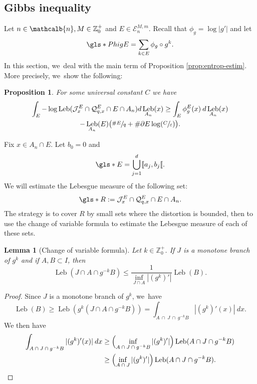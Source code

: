 \documentclass[10pt]{amsart}
\DeclareMathOperator{\Leb}{Leb}
\newcommand{\mcbn}{{\mathcalb{n}}}
\newtheorem{lem}[thm]{Lemma}
\newtheorem{prop}[thm]{Proposition}
\theoremstyle{definition}
\newcommand{\bbZ}{{\mathbb{Z}}}
\begin{document}
\subsection{Gibbs inequality}
\label{ssec:gibbs}

Let $n \in \mcbn, M \in \bbZ_0^+$ and $E \in \mathcal{E}_n^{M,m}$. Recall that $\phi_g = \log |g'|$ and let
\[
\gls*{PhigE} = \sum_{k \in E} \phi_g \circ g^k.
\]
In this section, we~deal with the main term of Proposition \ref{prop:entrop-estim}.
More precisely, we~show the following:

\begin{prop}
\label{prop:Gibbs}
For some universal constant $C$ we have
\begin{multline*}
\int_E - \log \Leb(\mathcal{J}^E_x \cap \mathcal{Q}_{q,x}^E \cap E \cap A_n) d \Leb_{A_n}(x)
\geq \int_E \phi_g^E(x) \: d \Leb_{A_n}(x)\\
- \Leb_{A_n}(E) \bigl (\sfrac{\# E }{q} + \# \partial E \log (\sfrac{C}{\varepsilon}) \bigr).
\end{multline*}
\end{prop}

Fix $x \in A_n \cap E$. Let $b_0 = 0$ and
\[
\gls*{E} = \bigcup_{j = 1}^d [\![ a_j, b_j [\![.
\]
We will estimate the Lebesgue measure of the following set:
\[
\gls*{R} := \mathcal{J}^E_x \cap \mathcal{Q}_{q,x}^{E} \cap E \cap A_n.
\]
The strategy is to cover $R$ by small sets where the distortion is bounded, then to use the change of variable formula to estimate the Lebesgue measure of each of these sets.

\begin{lem}[Change of variable formula]
\label{lem:chgt-var}
Let $k \in \bbZ_0^+$. If $J$ is a monotone branch of $g^k$ and if $A,B \subset I$, then
\[
\Leb(J \cap A \cap g^{-k} B) \leq \frac{1}{\inf_{J \cap A} |(g^k)'|} \Leb(B).
\]
\end{lem}
\begin{proof}
Since $J$ is a monotone branch of $g^k$, we~have
\[
\Leb(B) \geq \Leb(g^k(J \cap A \cap g^{-k} B)) = \int_{A \: \cap \: J \: \cap \: g^{-k} B} |(g^k)'(x)| \: dx.
\]
We then have
\begin{align*}
\int_{A \: \cap \: J \: \cap \: g^{-k} B} |(g^k)'(x)| \: dx
&\geq \Bigl (\inf_{A \: \cap \: J \: \cap \: g^{-k} B} |(g^k)'| \Bigr) \Leb(A \cap J \cap g^{-k} B)\\
&\geq \left (\inf_{A \: \cap \: J} |(g^k)'| \right) \Leb(A \cap J \cap g^{-k} B).\qedhere
\end{align*}
\end{proof}
\end{document}
